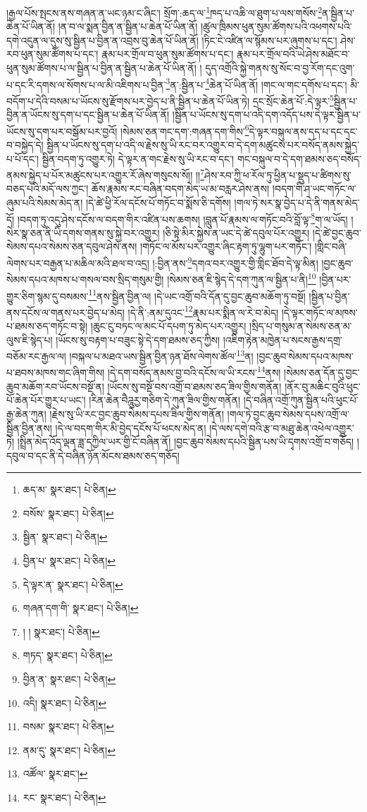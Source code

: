 །རྒྱལ་པོས་སྤངས་ནས་གཞན་ན་ཡང་ཉམ་ང་ཞིང་། སྲོག་:ཆད་ལ་\footnote{ཆད་མ་  སྣར་ཐང་།  པེ་ཅིན། }ཁད་པ་འཆི་ལ་ཐུག་པ་ལས་གསོས་\footnote{བསོས་  སྣར་ཐང་།  པེ་ཅིན། }ན་སྦྱིན་པ་ཆེན་པོ་ཡིན་ནོ། །ན་བ་ལ་སྨན་བྱིན་ན་སྦྱིན་པ་ཆེན་པོ་ཡིན་ནོ། །ཚུལ་ཁྲིམས་ཕུན་སུམ་ཚོགས་པའི་འཕགས་པའི་དགེ་འདུན་ལ་དུས་སུ་སྦྱིན་པ་བྱིན་ན་འབྲས་བུ་ཆེན་པོ་ཡིན་ནོ། །ཏིང་ངེ་འཛིན་ལ་སྙོམས་པར་ཞུགས་པ་དང་། ཤེས་རབ་ཕུན་སུམ་ཚོགས་པ་དང་། རྣམ་པར་གྲོལ་བ་ཕུན་སུམ་ཚོགས་པ་དང་། རྣམ་པར་གྲོལ་བའི་ཡེ་ཤེས་མཐོང་བ་ཕུན་སུམ་ཚོགས་པ་ལ་སྦྱིན་པ་བྱིན་ན་སྦྱིན་པ་ཆེན་པོ་ཡིན་ནོ། །
དུད་འགྲོའི་སྐྱེ་གནས་སུ་སོང་བ་བྱ་རོག་དང་འུག་པ་དང་རི་དགས་ལ་སོགས་པ་ལ་མི་འཇིགས་པ་བྱིན་\footnote{སྦྱིན་  སྣར་ཐང་།  པེ་ཅིན། }ན་:སྦྱིན་པ་\footnote{བྱིན་པ་  སྣར་ཐང་།  པེ་ཅིན། }ཆེན་པོ་ཡིན་ནོ། །གང་ལ་གང་དགོས་པ་དང་། མི་བདོག་པ་དེའི་བསམ་པ་ཡོངས་སུ་རྫོགས་པར་བྱེད་པ་ནི་སྦྱིན་པ་ཆེན་པོ་ཡིན་ཏེ། དྲང་སྲོང་ཆེན་པོ་:དེ་ལྟར་\footnote{དེ་ལྟར་ན་  སྣར་ཐང་།  པེ་ཅིན། }སྦྱིན་པ་བྱིན་ན་ཡོངས་སུ་དག་པ་དང་སྦྱིན་པ་ཆེན་པོ་ཡིན་ནོ། །སྦྱིན་པ་ཡོངས་སུ་དག་པ་འདི་དག་འདོད་པས་དེ་ལྟར་སྦྱིན་པ་ཡོངས་སུ་དག་པར་བསྒོམ་པར་བྱའོ། །སེམས་ཅན་གང་དག་:གཞན་དག་གིས་\footnote{གཞན་དག་གི་  སྣར་ཐང་།  པེ་ཅིན། }དེ་ལྟར་བསྐུལ་ནས་དད་པ་དང་དང་བ་བསྐྱེད་དེ། སྦྱིན་པ་ཡོངས་སུ་དག་པ་འདི་ལ་རྗེས་སུ་ཡི་རང་བར་འགྱུར་བ་དེ་དག་མཚུངས་པར་བསོད་ནམས་སྐྱེད་པ་པོ་དང་། སྦྱིན་བདག་ཏུ་འགྱུར་ཏེ། དེ་ལྟར་ན་གང་རྗེས་སུ་ཡི་རང་བ་དང་། གང་བསྐུལ་བ་དེ་དག་ཐམས་ཅད་བསོད་ནམས་སྐྱེད་པ་པོར་མཚུངས་པར་འགྱུར་རོ་ཞེས་གསུངས་སོ།། །།\footnote{། །  སྣར་ཐང་།  པེ་ཅིན། }ཤེས་རབ་ཀྱི་ཕ་རོལ་ཏུ་ཕྱིན་པ་སྡུད་པ་ཚིགས་སུ་བཅད་པའི་མདོ་ལས་ཀྱང་། ཆོས་རྣམས་རང་བཞིན་བདག་མེད་ཡ་མ་བརླར་ཤེས་ནས། །བདག་གི་ཤ་ཡང་གཏོང་ལ་ཞུམ་པའི་སེམས་མེད་ན། །དེ་ཚེ་ཕྱི་རོལ་དངོས་པོ་གཏོང་བ་སྨོས་ཅི་དགོས། །གལ་ཏེ་སར་སྣ་བྱེད་པ་དེ་ནི་གནས་མེད་དོ། །བདག་ཏུ་འདུ་ཤེས་དངོས་ལ་བདག་གིར་འཛིན་པས་ཆགས། །བླུན་པོ་རྣམས་ལ་གཏོང་བའི་བློ་ལྟ་\footnote{གཏད་  སྣར་ཐང་།  པེ་ཅིན། }ག་ལ་ཡོད། །སེར་སྣ་ཅན་ནི་ཡི་དགས་གནས་སུ་སྐྱེ་བར་འགྱུར། །ཅི་སྟེ་མིར་སྐྱེས་ན་ཡང་དེ་ཚེ་དབུལ་པོར་འགྱུར། །དེ་ཚེ་བྱང་ཆུབ་སེམས་དཔའ་སེམས་ཅན་དབུལ་ཤེས་ནས། །གཏོང་ལ་མོས་པར་འགྱུར་ཞིང་རྟག་ཏུ་ལྷུག་པར་གཏོང་། །གླིང་བཞི་ལེགས་པར་བརྒྱན་པ་མཆིལ་མའི་ཐལ་བ་འདྲ། །:བྱིན་ནས་\footnote{བྱིན་ན་  སྣར་ཐང་།  པེ་ཅིན། }དགའ་བར་འགྱུར་གྱི་གླིང་ཐོབ་དེ་ལྟ་མིན། །བྱང་ཆུབ་སེམས་དཔའ་མཁས་པ་གསལ་བས་སྲིད་གསུམ་གྱི། །སེམས་ཅན་ཇི་སྙེད་དེ་དག་ཀུན་ལ་སྦྱིན་པ་ནི།\footnote{འདི།  སྣར་ཐང་།  པེ་ཅིན། } །བྱིན་པར་གྱུར་ཅིག་སྙམ་དུ་བསམས་\footnote{བསམ་  སྣར་ཐང་།  པེ་ཅིན། }ནས་སྦྱིན་བྱིན་ལ། །དེ་ཡང་འགྲོ་བའི་དོན་དུ་བྱང་ཆུབ་མཆོག་ཏུ་བསྔོ། །སྦྱིན་པ་བྱིན་ནས་དངོས་ལ་གནས་པར་བྱེད་པ་མེད། །དེ་ནི་:ནམ་དུའང་\footnote{ནམ་དུ་  སྣར་ཐང་།  པེ་ཅིན། }རྣམ་པར་སྨིན་ལ་རེ་བ་མེད། །དེ་ལྟར་གཏོང་ལ་མཁས་པ་ཐམས་ཅད་གཏོང་བ་སྟེ། །ཆུང་ངུ་བཏང་ལ་མང་པོ་དཔག་ཏུ་མེད་པར་འགྱུར། །སྲིད་པ་གསུམ་ན་སེམས་ཅན་མ་ལུས་ཇི་སྙེད་པ། །ཡོངས་སུ་བརྟག་པ་བཟུང་སྟེ་དེ་དག་ཐམས་ཅད་ཀྱིས། །འཇིག་རྟེན་མཁྱེན་པ་སངས་རྒྱས་དགྲ་བཅོམ་རང་རྒྱལ་ལ། །བསྐལ་པ་མཐའ་ཡས་སྦྱིན་བྱིན་ཉན་ཐོས་ལེགས་ཚོལ་\footnote{འཚོལ་  སྣར་ཐང་། }ན། །བྱང་ཆུབ་སེམས་དཔའ་མཁས་པ་ཐབས་མཁས་གང་ཞིག་གིས། །དེ་དག་བསོད་ནམས་བྱ་བའི་དངོས་ལ་ཡི་རངས་\footnote{རང་  སྣར་ཐང་།  པེ་ཅིན། }ནས། །སེམས་ཅན་དོན་དུ་བྱང་ཆུབ་མཆོག་རབ་ཡོངས་བསྔོ་ན། །ཡོངས་སུ་བསྔོ་བས་འགྲོ་བ་ཐམས་ཅད་ཟིལ་གྱིས་གནོན། །ནོར་བུ་མཆིང་བུའི་ཕུང་པོ་ཆེན་པོར་གྱུར་པ་ཡང་། །རིན་ཆེན་བཻཌཱུརྱ་གཅིག་དེ་ཀུན་ཟིལ་གྱིས་གནོན། །དེ་བཞིན་འགྲོ་ཀུན་སྦྱིན་པའི་ཕུང་པོ་རྒྱ་ཆེན་ཀུན། །རྗེས་སུ་ཡི་རང་བྱང་ཆུབ་སེམས་དཔས་ཟིལ་གྱིས་གནོན། །གལ་ཏེ་བྱང་ཆུབ་སེམས་དཔས་འགྲོ་ལ་སྦྱིན་བྱིན་ནས། །དེ་ལ་བདག་གིར་མི་བྱེད་དངོས་པོ་ཕངས་མེད་ན། །དེ་ལས་དགེ་བའི་རྩ་བ་མཐུ་ཆེན་འཕེལ་འགྱུར་ཏེ། །སྤྲིན་མེད་འོད་ལྡན་ཟླ་དཀྱིལ་ཡར་གྱི་ངོ་བཞིན་ནོ། །བྱང་ཆུབ་སེམས་དཔའི་སྦྱིན་པས་ཡི་དྭགས་འགྲོ་བ་གཅོད། །དབུལ་བ་དང་ནི་དེ་བཞིན་ཉོན་མོངས་ཐམས་ཅད་གཅོད། 